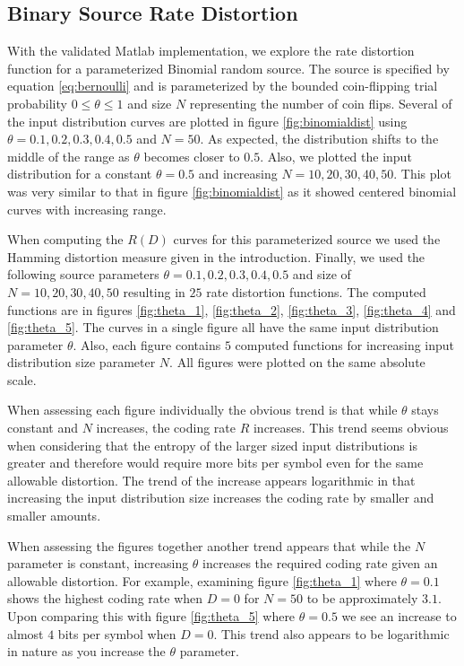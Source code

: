 \documentclass[journal]{IEEEtran}
\begin{document}
\subsection{Binary Source Rate Distortion}
With the validated Matlab implementation, we explore the rate distortion function for a parameterized Binomial random source. The source is specified by equation \ref{eq:bernoulli} and is parameterized by the bounded coin-flipping trial probability \(0 \leq \theta \leq 1\) and size \(N\) representing the number of coin flips. Several of the input distribution curves are plotted in figure \ref{fig:binomialdist} using \(\theta={{0.1,0.2,0.3,0.4,0.5}}\) and \(N=50\). As expected, the distribution shifts to the middle of the range as \(\theta\) becomes closer to \(0.5\). Also, we plotted the input distribution for a constant \(\theta = 0.5\) and increasing \(N={ {10,20,30,40,50} }\). This plot was very similar to that in figure \ref{fig:binomialdist} as it showed centered binomial curves with increasing range.
\par When computing the \(R(D)\) curves for this parameterized source we used the Hamming distortion measure given in the introduction. Finally, we used the following source parameters \(\theta = {{0.1,0.2,0.3,0.4,0.5}}\) and size of \(N = {{10,20,30,40,50}}\) resulting in \(25\) rate distortion functions. The computed functions are in figures \ref{fig:theta_1}, \ref{fig:theta_2}, \ref{fig:theta_3}, \ref{fig:theta_4} and \ref{fig:theta_5}. The curves in a single figure all have the same input distribution parameter \(\theta\). Also, each figure contains \(5\) computed functions for increasing input distribution size parameter \(N\). All figures were plotted on the same absolute scale.
\par When assessing each figure individually the obvious trend is that while \(\theta\) stays constant and \(N\) increases, the coding rate \(R\) increases. This trend seems obvious when considering that the entropy of the larger sized input distributions is greater and therefore would require more bits per symbol even for the same allowable distortion. The trend of the increase appears logarithmic in that increasing the input distribution size increases the coding rate by smaller and smaller amounts.
\par When assessing the figures together another trend appears that while the \(N\) parameter is constant, increasing \(\theta\) increases the required coding rate given an allowable distortion. For example, examining figure \ref{fig:theta_1} where \(\theta=0.1\) shows the highest coding rate when \(D=0\) for \(N=50\) to be approximately \(3.1\). Upon comparing this with figure \ref{fig:theta_5} where \(\theta=0.5\) we see an increase to almost \(4\) bits per symbol when \(D=0\). This trend also appears to be logarithmic in nature as you increase the \(\theta\) parameter.
\end{document}
